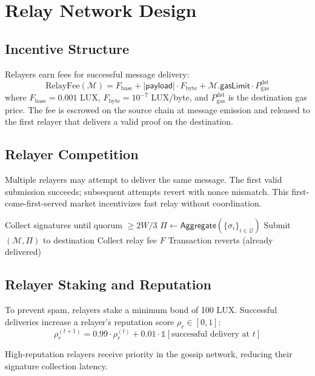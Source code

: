 \section{Relay Network Design}
\label{sec:relay}

\subsection{Incentive Structure}

Relayers earn fees for successful message delivery:
\begin{equation}
    \text{RelayFee}(\mathcal{M}) = F_{\text{base}} + |\mathsf{payload}| \cdot F_{\text{byte}} + \mathcal{M}.\mathsf{gasLimit} \cdot P_{\text{gas}}^{\text{dst}}
\end{equation}
where $F_{\text{base}} = 0.001$ LUX, $F_{\text{byte}} = 10^{-7}$ LUX/byte, and $P_{\text{gas}}^{\text{dst}}$ is the destination gas price. The fee is escrowed on the source chain at message emission and released to the first relayer that delivers a valid proof on the destination.

\subsection{Relayer Competition}

Multiple relayers may attempt to deliver the same message. The first valid submission succeeds; subsequent attempts revert with nonce mismatch. This first-come-first-served market incentivizes fast relay without coordination.

\begin{algorithm}[H]
\caption{Relayer Selection via Competition}
\label{alg:relayer}
\begin{algorithmic}[1]
    \State Collect signatures until quorum $\geq 2W/3$
    \State $\Pi \gets \mathsf{Aggregate}(\{\sigma_i\}_{i \in \mathcal{Q}})$
    \State Submit $(\mathcal{M}, \Pi)$ to destination
        \State Collect relay fee $F$
    \Else
        \State Transaction reverts (already delivered)
    \EndIf
\EndFor
\end{algorithmic}
\end{algorithm}

\subsection{Relayer Staking and Reputation}

To prevent spam, relayers stake a minimum bond of 100 LUX. Successful deliveries increase a relayer's reputation score $\rho_r \in [0, 1]$:
\begin{equation}
    \rho_r^{(t+1)} = 0.99 \cdot \rho_r^{(t)} + 0.01 \cdot \mathbb{1}[\text{successful delivery at } t]
\end{equation}

High-reputation relayers receive priority in the gossip network, reducing their signature collection latency.

